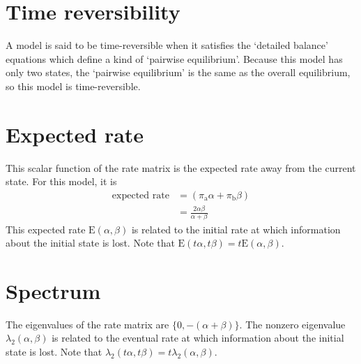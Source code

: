 \documentclass{article}
\providecommand{\Ao}{\text{a}}
\providecommand{\Bo}{\text{b}}
\providecommand{\Pa}{\alpha}
\providecommand{\Pb}{\beta}
\begin{document}
\section{Time reversibility}

A model is said to be time-reversible when it satisfies the
`detailed balance' equations which define a kind of `pairwise equilibrium'.
Because this model has only two states, the `pairwise equilibrium'
is the same as the overall equilibrium, so this model is time-reversible.

\section{Expected rate}

This scalar function of the rate matrix is the expected rate
away from the current state.
For this model, it is
\begin{align}
\text{expected rate}
&=
\left( \pi_\Ao \Pa + \pi_\Bo \Pb \right) \\
&=
\frac{2 \Pa \Pb}{\Pa + \Pb}
\end{align}
This expected rate
$\text{E} \left( \Pa, \Pb \right)$
is related to the initial rate at which
information about the initial state is lost.
Note that
$\text{E} \left( t \Pa, t \Pb \right) = t \text{E} \left( \Pa, \Pb \right)$.

\section{Spectrum}

The eigenvalues of the rate matrix are
$\{ 0, -\left( \Pa + \Pb \right) \}$.
The nonzero eigenvalue
$\lambda_2 \left( \Pa, \Pb \right)$
is related to the eventual rate
at which information about the initial state is lost.
Note that
$\lambda_2 \left( t \Pa, t \Pb \right) = t \lambda_2 \left( \Pa, \Pb \right)$.
\end{document}
